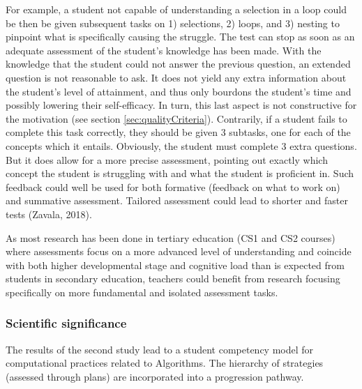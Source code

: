 For example, a student not capable of understanding a selection in a loop could be then be given subsequent tasks on 1) selections, 2) loops, and 3) nesting to pinpoint what is specifically causing the struggle. The test can stop as soon as an adequate assessment of the student's knowledge has been made. With the knowledge that the student could not answer the previous question, an extended question is not reasonable to ask. It does not yield any extra information about the student's level of attainment, and thus only bourdons the student's time and possibly lowering their self-efficacy. In turn, this last aspect is not constructive for the motivation (see section \ref{sec:qualityCriteria}). Contrarily, if a student fails to complete this task correctly, they should be given 3 subtasks, one for each of the concepts which it entails. Obviously, the student must complete 3 extra questions. But it does allow for a more precise assessment, pointing out exactly which concept the student is struggling with and what the student is proficient in. Such feedback could well be used for both formative (feedback on what to work on) and summative assessment. Tailored assessment could lead to shorter and faster tests (Zavala, 2018).





As most research has been done in tertiary education (CS1 and CS2 courses) where assessments focus on a more advanced level of understanding and coincide with both higher developmental stage and cognitive load than is expected from students in secondary education, teachers could benefit from research focusing specifically on more fundamental and isolated assessment tasks.




\subsubsection*{Scientific significance}
The results of the second study lead to a student competency model for computational practices related to Algorithms. The hierarchy of strategies (assessed through plans) are incorporated into a progression pathway.


